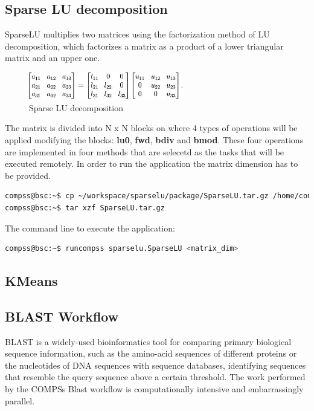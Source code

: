 \subsection{Sparse LU decomposition}
SparseLU multiplies two matrices using the factorization method of LU decomposition, which factorizes a 
matrix as a product of a lower triangular matrix and an upper one.

\begin{figure}[ht!]
  \centering
    \includegraphics[width=0.6\textwidth]{./Sections/2_Java/Figures/SparseLU.jpeg}
    \caption{Sparse LU decomposition}
    \label{fig:SparseLO}
\end{figure}

The matrix is divided into N x N blocks on where 4 types of operations will be applied modifying the blocks: 
{\bf lu0}, {\bf fwd}, {\bf bdiv} and {\bf bmod}. These four operations are implemented in four methods that 
are selecetd as the tasks that will be executed remotely. In order to run the application the matrix dimension 
has to be provided.

\begin{lstlisting}[language=bash]
compss@bsc:~$ cp ~/workspace/sparselu/package/SparseLU.tar.gz /home/compss/
compss@bsc:~$ tar xzf SparseLU.tar.gz
\end{lstlisting}

The command line to execute the application:

\begin{lstlisting}[language=bash]
compss@bsc:~$ runcompss sparselu.SparseLU <matrix_dim>
\end{lstlisting}


\subsection{KMeans}


\subsection{BLAST Workflow}
BLAST is a widely-used bioinformatics tool for comparing primary biological sequence information, such as 
the amino-acid sequences of different proteins or the nucleotides of DNA sequences with sequence databases, 
identifying sequences that resemble the query sequence above a certain threshold. 
The work performed by the COMPSs Blast workflow is computationally intensive and embarrassingly parallel.

